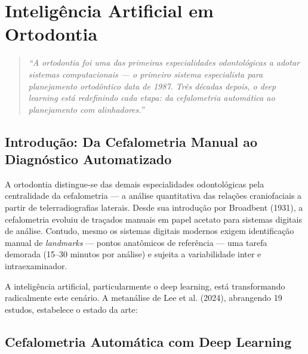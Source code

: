 \chapter{Inteligência Artificial em Ortodontia}
\label{cap:ortodontia-ia}
\niveltres

\begin{quote}
\textit{``A ortodontia foi uma das primeiras especialidades odontológicas a adotar sistemas computacionais --- o primeiro sistema especialista para planejamento ortodôntico data de 1987. Três décadas depois, o deep learning está redefinindo cada etapa: da cefalometria automática ao planejamento com alinhadores.''}
\end{quote}

\section{Introdução: Da Cefalometria Manual ao Diagnóstico Automatizado}

A ortodontia distingue-se das demais especialidades odontológicas pela centralidade da cefalometria --- a análise quantitativa das relações craniofaciais a partir de telerradiografias laterais. Desde sua introdução por Broadbent (1931), a cefalometria evoluiu de traçados manuais em papel acetato para sistemas digitais de análise. Contudo, mesmo os sistemas digitais modernos exigem identificação manual de \textit{landmarks} --- pontos anatômicos de referência --- uma tarefa demorada (15--30 minutos por análise) e sujeita a variabilidade inter e intraexaminador.

A inteligência artificial, particularmente o deep learning, está transformando radicalmente este cenário. A metanálise de Lee et al. (2024), abrangendo 19 estudos, estabelece o estado da arte:


\section{Cefalometria Automática com Deep Learning}

